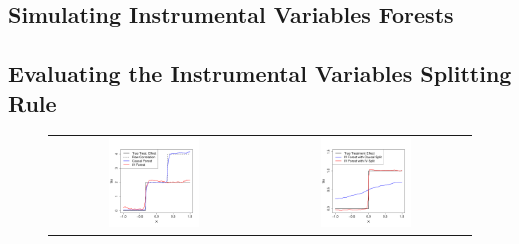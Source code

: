 \documentclass[aos]{imsart}
\theoremstyle{plain}
\theoremstyle{definition}
\theoremstyle{remark}
\newcommand{\FIGW}{0.45}
\begin{document}
\begin{CJK}{UTF8}{gbsn}
\begin{appendix}
\section{Simulating Instrumental Variables Forests}
\label{sec:iv_simu}


\subsection{Evaluating the Instrumental Variables Splitting Rule}
\label{sec:iv_split}

\begin{figure}
\centering
\begin{tabular}{cc}
\includegraphics[width=\FIGW\textwidth]{IV_plot_10k_20.pdf} &
\includegraphics[width=\FIGW\textwidth]{IV_forest_causal_splitting.pdf}

\end{tabular}
\end{figure}
\end{appendix}
\end{CJK}
\end{document}

